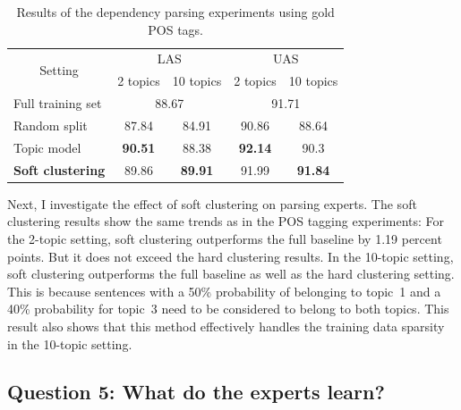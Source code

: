 \begin{table}[t!]
	\centering
	\begin{tabular}{l|cc|cc}
		\multicolumn{1}{c|}{\multirow{2}{*}{Setting}} & \multicolumn{2}{c|}{LAS}                                      & \multicolumn{2}{c}{UAS}                                     \\
		\multicolumn{1}{c|}{}                         & \multicolumn{1}{l}{2 topics} & \multicolumn{1}{r|}{10 topics} & \multicolumn{1}{l}{2 topics} & \multicolumn{1}{r}{10 topics} \\ \hline
		Full training set                             & \multicolumn{2}{c|}{88.67}                                    & \multicolumn{2}{c}{91.71}                                   \\
		Random split                                  & 87.84                        & 84.91                          & 90.86                        & 88.64                         \\
		Topic model                                   & \textbf{90.51}               & 88.38                          & \textbf{92.14}               & 90.3                          \\ 
		\textbf{Soft clustering}                               & 89.86                        & \textbf{89.91}                 & 91.99                        & \textbf{91.84}                \\ \hline
	\end{tabular}
	\caption{Results of the dependency parsing experiments using gold POS tags.}
	\label{tab:parsingsoftcluster}
\end{table}


Next, I investigate the effect of soft clustering on parsing experts. The soft clustering results show the same trends as in the POS tagging experiments:  For the 2-topic setting, soft clustering outperforms the full baseline by 1.19 percent points. But it does not exceed the hard clustering results.  In the 10-topic setting, soft clustering outperforms the full baseline as well as the hard clustering setting. This is because sentences with a 50\% probability of belonging to topic~1 and a 40\% probability for topic~3 need to be considered to belong to both topics. This result also shows that this method effectively handles the training data sparsity in the 10-topic setting.


\subsection*{Question 5: What do the experts learn?}

